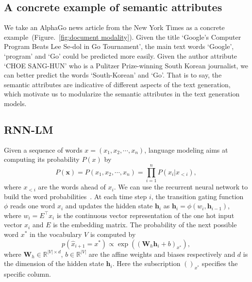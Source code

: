 \documentclass[a4paper]{article}
\begin{document}
\subsection{A concrete example of semantic attributes}\label{sec:semantic_attribute}
We take an AlphaGo news article from the New York Times
     as a concrete example~(Figure.~\ref{fig:document modality}).
Given the title `Google’s Computer Program Beats Lee Se-dol in Go Tournament', the main text words `Google', `program' and `Go' could be predicted more easily. Given the author attribute `CHOE SANG-HUN' who is a Pulitzer Prize-winning South Korean journalist, we can better predict the words `South-Korean' and `Go'. That is to say, the semantic attributes are indicative of different aspects of the text generation, which motivate us to modularize the semantic attributes in the text generation models.
\subsection{RNN-LM}\label{sec:rnnlm}
Given a sequence of words $x = (x_1, x_2, \cdots, x_n)$, language modeling aims at computing its probability $P(x)$ by
\begin{equation}
    P(\mathbf{x})=P(x_1,x_2,\cdots,x_n)=\prod_{i=1}^{n}P(x_i|x_ {<i}),
\end{equation}
where $x_{<i}$ are the words ahead of $x_{i}$.
We can use the recurrent neural network to build the word probabilities~\cite{mikolov2010recurrent}.
At each time step $i$, the transition gating function $\phi$ reads one word $x_i$ and updates the hidden state $\mathbf{h}_{i}$ as $
    \mathbf{h}_{i}=\phi(w_{i},\mathbf{h}_{i-1})$, where $w_{i}=E^{\top}x_{i}$ is the continuous vector representation of the one hot input vector $x_{i}$ and $E$ is the embedding matrix.
The probability of the next possible word $x^{*}$ in the vocabulary $V$ is computed by
\begin{equation}
    p(\hat{x}_{i+1}=x^{*})\propto\exp((\mathbf{W}_{h}\mathbf{h}_{i}+b)_{x^{*}}),
\end{equation}
where $\mathbf{W}_{h}\in\mathbb{R}^{|V|\times d}$, $b\in\mathbb{R}^{|V|}$ are the affine weights and biases respectively and $d$ is the dimension of the hidden state $\mathbf{h}_{i}$. Here the subscription $()_{x^{*}}$ specifies the specific column.
\end{document}
